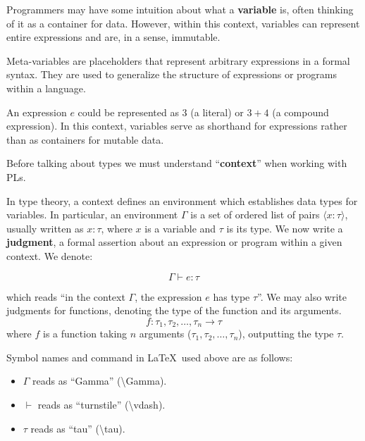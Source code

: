 \newpage

Programmers may have some intuition about what a \textbf{variable} is, often thinking of it as a container for data.
However, within this context, variables can represent entire expressions and are, in a sense, immutable.
\begin{Def}

    Meta-variables are placeholders that represent arbitrary expressions in a formal syntax.
    They are used to generalize the structure of expressions or programs within a language.
\end{Def}

\vspace{-1em}
\begin{Example}

    An expression $e$ could be represented as $3$ (a literal) or $3 + 4$ (a compound expression).
    In this context, variables serve as shorthand for expressions rather than as containers for mutable data.
\end{Example}

\noindent
Before talking about types we must understand ``\textbf{context}'' when working with PLs.


\begin{Def}

    In type theory, a context defines an environment which establishes data types for variables.
    In particular, an environment $\Gamma$ is a set of ordered list of pairs $\langle x : \tau \rangle$, usually written as $x : \tau$,
    where $x$ is a variable and $\tau$ is its type. We now write a \textbf{judgment},
    a formal assertion about an expression or program within a given context. We denote:\LARGE

    \vspace{-1em}
    \[\Gamma \vdash e: \tau\]

    \normalsize 
    \noindent
    which reads ``in the context $\Gamma$, the expression $e$ has type $\tau$''. 
    We may also write judgments for functions, denoting the type of the function and its arguments.
    \LARGE
    \[ f : \tau_1, \tau_2, \ldots, \tau_n \rightarrow \tau \]
    \normalsize
    \noindent 
    where $f$ is a function taking $n$ arguments ($\tau_1, \tau_2, \ldots, \tau_n$), outputting the type $\tau$.
    
    \hfill \cite{WikipediaTypingEnvironment}
\end{Def}

\vspace{-1em}
\begin{Tip}
    Symbol names and command in \LaTeX \ used above are as follows:
    \begin{itemize}
        \item $\Gamma$ reads as ``Gamma'' (\textbackslash Gamma).
        \item $\vdash$ reads as ``turnstile'' (\textbackslash vdash).
        \item $\tau$ reads as ``tau'' (\textbackslash tau).
    \end{itemize}
\end{Tip}

